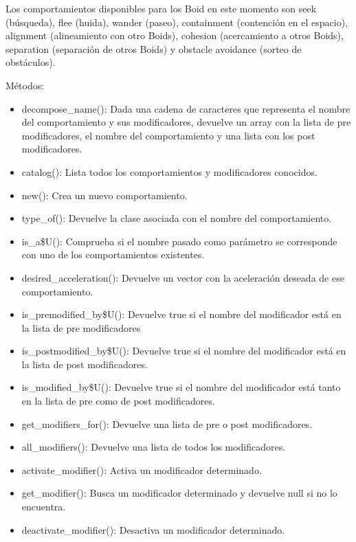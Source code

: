 Los comportamientos disponibles para los Boid en este momento son seek (búsqueda), flee (huida), wander (paseo), containment (contención 
en el espacio), alignment (alineamiento con otro Boids), cohesion (acercamiento a otros Boids), separation (separación de otros Boids) y 
obstacle avoidance (sorteo de obstáculos).

Métodos:
\begin{itemize}
\item decompose\_name():
Dada una cadena de caracteres que representa el nombre del comportamiento y sus modificadores, devuelve un array con la lista de pre
modificadores, el nombre del comportamiento y una lista con los post modificadores.

\item catalog():
Lista todos los comportamientos y modificadores conocidos.

\item new():
Crea un nuevo comportamiento.

\item type\_of():
Devuelve la clase asociada con el nombre del comportamiento.

\item is\_a\$U():
Comprueba si el nombre pasado como parámetro se corresponde con uno de los comportamientos existentes.

\item desired\_acceleration():
Devuelve un vector con la aceleración deseada de ese comportamiento.

\item is\_premodified\_by\$U():
Devuelve true si el nombre del modificador está en la lista de pre modificadores

\item is\_postmodified\_by\$U():
Devuelve true si el nombre del modificador está en la lista de post modificadores.

\item is\_modified\_by\$U():
Devuelve true si el nombre del modificador está tanto en la lista de pre como de post modificadores.

\item get\_modifiers\_for():
Devuelve una lista de pre o post modificadores.

\item all\_modifiers():
Devuelve una lista de todos los modificadores.

\item activate\_modifier():
Activa un modificador determinado.

\item get\_modifier():
Busca un modificador determinado y devuelve null si no lo encuentra.

\item deactivate\_modifier():
Desactiva un modificador determinado.
\end{itemize}


